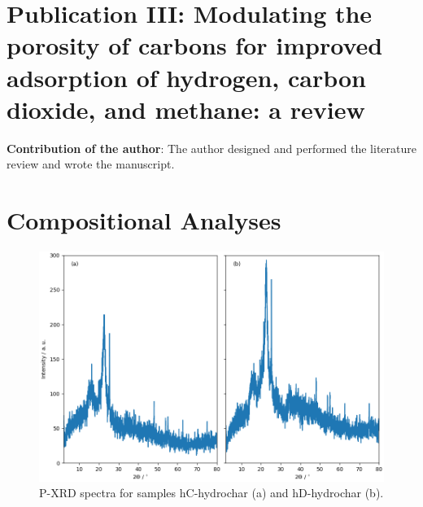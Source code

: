 \begin{appendices}

\newpage
\setcounter{opagenum}{\thepage}
\chapter[Publication III]{Publication III: Modulating the porosity of carbons for improved adsorption of hydrogen, carbon dioxide, and methane: a review}\label{ap:review}

\textbf{Contribution of the author}: The author designed and performed the literature review and wrote the manuscript.

\clearpage
\newpage

\setlength{\originalVOffset}{\voffset}   
\setlength{\originalHOffset}{\hoffset}

\setlength{\voffset}{0cm}
\setlength{\hoffset}{0cm}

\setlength{\voffset}{\originalVOffset}
\setlength{\hoffset}{\originalHOffset}

\clearpage

\chapter{Compositional Analyses}
\newpage
\begin{figure}[hptb]
    \centering
    \includegraphics[width=\columnwidth, keepaspectratio]{4-cbs/figs/xrd_hydrochar.png}
    \caption{P-XRD spectra for samples hC-hydrochar (a) and hD-hydrochar (b).}
    \label{fig:xrd_hydrochar}
\end{figure}


\end{appendices}
